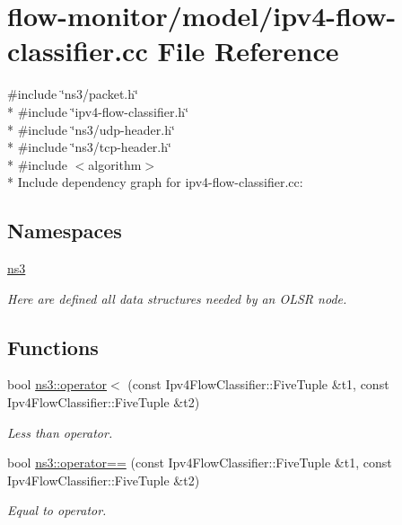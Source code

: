 \hypertarget{ipv4-flow-classifier_8cc}{}\section{flow-\/monitor/model/ipv4-\/flow-\/classifier.cc File Reference}
\label{ipv4-flow-classifier_8cc}
{\ttfamily \#include \char`\"{}ns3/packet.\+h\char`\"{}}\\*
{\ttfamily \#include \char`\"{}ipv4-\/flow-\/classifier.\+h\char`\"{}}\\*
{\ttfamily \#include \char`\"{}ns3/udp-\/header.\+h\char`\"{}}\\*
{\ttfamily \#include \char`\"{}ns3/tcp-\/header.\+h\char`\"{}}\\*
{\ttfamily \#include $<$algorithm$>$}\\*
Include dependency graph for ipv4-\/flow-\/classifier.cc\+:
\subsection*{Namespaces}
\begin{DoxyCompactItemize}
\item 
 \hyperlink{namespacens3}{ns3}
\begin{DoxyCompactList}\small\item\em Here are defined all data structures needed by an O\+L\+SR node. \end{DoxyCompactList}\end{DoxyCompactItemize}
\subsection*{Functions}
\begin{DoxyCompactItemize}
\item 
bool \hyperlink{namespacens3_ae038403670f2dcdc43f5f36b2c0c78a9}{ns3\+::operator$<$} (const Ipv4\+Flow\+Classifier\+::\+Five\+Tuple \&t1, const Ipv4\+Flow\+Classifier\+::\+Five\+Tuple \&t2)
\begin{DoxyCompactList}\small\item\em Less than operator. \end{DoxyCompactList}\item 
bool \hyperlink{namespacens3_a22e1e264f3073029629ee0f132e558aa}{ns3\+::operator==} (const Ipv4\+Flow\+Classifier\+::\+Five\+Tuple \&t1, const Ipv4\+Flow\+Classifier\+::\+Five\+Tuple \&t2)
\begin{DoxyCompactList}\small\item\em Equal to operator. \end{DoxyCompactList}\end{DoxyCompactItemize}
